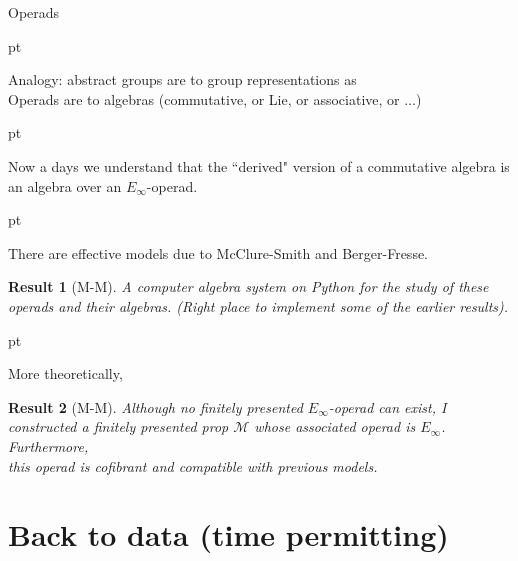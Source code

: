 \documentclass[10pt,t]{beamer} %
\newtheorem{result}{Result}
\begin{document}
\begin{frame}{Operads}
	
	 pt
	
	\textcolor{pblue}{Analogy}:	abstract groups are to group representations as	\\
	Operads are to algebras (commutative, or Lie, or associative, or $\dots$)	
	
	 pt
	\pause
	
	Now a days we understand that the ``derived" version of a commutative algebra is an algebra over an $E_\infty$-operad. 
	
	 pt
	\pause
	
	There are effective models due to McClure-Smith and Berger-Fresse.
	
	\begin{result}[M-M]
		A computer algebra system on Python for the study of these operads and their algebras. (Right place to implement some of the earlier results).
	\end{result}
	
	 pt
	\pause
	
	More theoretically,
	
	\begin{result}[M-M]
		Although no finitely presented $E_\infty$-operad can exist, I constructed a finitely presented prop $\mathcal M$ whose associated operad is $E_\infty$. Furthermore, \\
		this operad is cofibrant and compatible with previous models.		
	\end{result}
\end{frame}

\section{Back to data (time permitting)}
\end{document}
